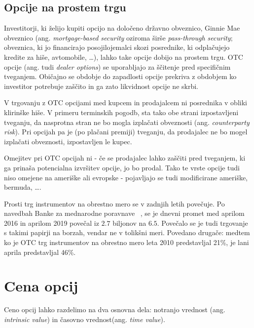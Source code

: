 \documentclass[a4paper]{article}
\begin{document}
\subsection{Opcije na prostem trgu}
Investitorji, ki želijo kupiti opcijo na določeno državno obveznico, Ginnie Mae obveznico (ang. \textit{mortgage-based security} oziroma širše \textit{pass-through security};
obveznica, ki jo financirajo posojilojemalci skozi posrednike, ki odplačujejo kredite za hiše, avtomobile, \ldots), lahko take opcije dobijo na prostem trgu.
OTC opcije (ang. tudi \textit{dealer options}) se uporabljajo za ščitenje pred specifičnim tveganjem. Običajno se obdobje do zapadlosti opcije prekriva z obdobjem 
ko investitor potrebuje zaščito in ga zato likvidnost opcije ne skrbi.

V trgovanju z OTC opcijami med kupcem in prodajalcem ni posrednika v obliki klirinške hiše. V primeru terminskih pogodb, sta tako
obe strani izpostavljeni tveganju, da nasprotna stran ne bo mogla izplačati obveznosti (ang. \textit{counterparty risk}). Pri opcijah
pa je (po plačani premiji) tveganju, da prodajalec ne bo mogel izplačati obveznosti, izpostavljen le kupec.

Omejitev pri OTC opcijah ni - če se prodajalec lahko zaščiti pred tveganjem, ki ga prinaša potencialna izvršitev opcije, jo bo prodal.
Tako te vrste opcije tudi niso omejene na ameriške ali evropske - pojavljajo se tudi modificirane ameriške, bermuda, \ldots.

Prosti trg instrumentov na obrestno mero se v zadnjih letih povečuje. Po navedbah Banke za mednarodne poravnave ~\cite{bis}, se je dnevni promet
med aprilom 2016 in aprilom 2019 povečal iz \textdollar$2.7$ biljonov na \textdollar$6.5$. Povečalo se je tudi trgovanje s takimi papirji na borzah, 
vendar ne v tolikšni meri. Povedano drugače: medtem ko je OTC trg instrumentov na obrestno mero leta 2010 predstavljal 21\%, je lani aprila predstavljal
46\%. 

\section{Cena opcij} \label{cenaopcij}
Ceno opcij lahko razdelimo na dva osnovna dela: notranjo vrednost (ang. \textit{intrinsic value}) in časovno vrednost(ang. \textit{time value}).
\end{document}
